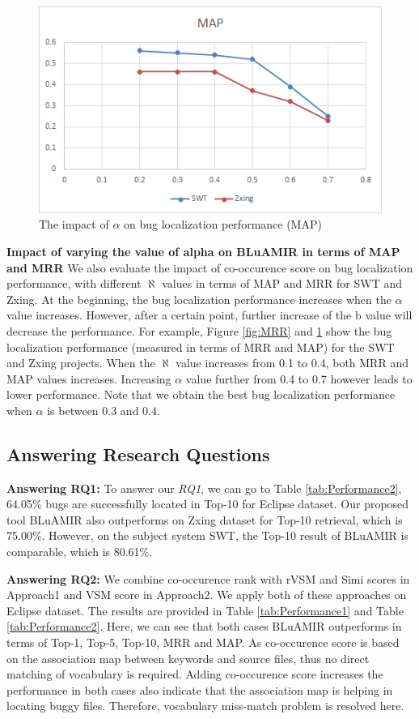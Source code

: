 \documentclass[conference]{IEEEtran}
\begin{document}
\begin{figure}
	\centering
	\includegraphics[scale=0.80]{MAP-SWT-Zxing}
	\caption{The impact of $\alpha$ on bug localization performance (MAP)}
	\label{fig:MAP}
\end{figure}
\textbf{Impact of varying the value of alpha on BLuAMIR in terms of MAP and MRR}
We also evaluate the impact of co-occurence score
on bug localization performance, with different $\aleph$ values in terms of MAP and MRR for SWT and Zxing. At the beginning, the bug localization performance increases when the $\alpha$ value increases. However, after a certain point, further increase of the b value will decrease the performance. For example, Figure \ref{fig:MRR} and \ref{fig:MAP} show the bug localization performance (measured in terms of MRR and MAP) for the SWT and Zxing projects. When the $\aleph$ value increases from 0.1 to 0.4, both MRR and MAP values increases. Increasing $\alpha$ value further from 0.4 to 0.7 however leads to lower performance. Note that we obtain the best bug localization performance when $\alpha$ is between 0.3 and 0.4.

\subsection{\textbf{Answering Research Questions}}
\textbf{Answering RQ1:} To answer our \textit{RQ1}, we can go to Table \ref{tab:Performance2}, 64.05\% bugs are successfully located in Top-10 for Eclipse dataset. Our proposed tool BLuAMIR also outperforms on Zxing dataset for Top-10 retrieval, which is 75.00\%. However, on the subject system SWT, the Top-10 result of BLuAMIR is comparable, which is 80.61\%.

\textbf{Answering RQ2:}
We combine co-occurence rank with rVSM and Simi scores in Approach1 and VSM score in Approach2. We apply both of these approaches on Eclipse dataset. The results are provided in Table \ref{tab:Performance1} and Table \ref{tab:Performance2}. Here, we can see that both cases BLuAMIR outperforms in terms of Top-1, Top-5, Top-10, MRR and MAP. As co-occurence score is based on the association map between keywords and source files, thus no direct matching of vocabulary is required. Adding co-occurence score increases the performance in both cases also indicate that the association map is helping in locating buggy files. Therefore, vocabulary miss-match problem is resolved here. 
\end{document}
